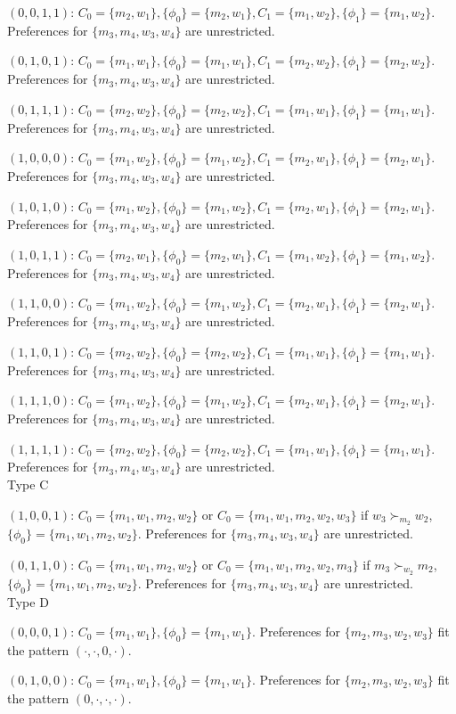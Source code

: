\documentclass[WP]{AEA}
\begin{document}
$(0,0,1,1)$: $C_0 =\{m_2,w_1\}, \{\phi_0\}=\{m_2,w_1\}, C_1 =\{m_1,w_2\}, \{\phi_1\}=\{m_1,w_2\}$.  Preferences for $\{m_3,m_4,w_3,w_4\}$ are unrestricted.


$(0,1,0,1)$: $C_0 =\{m_1,w_1\}, \{\phi_0\}=\{m_1,w_1\}, C_1 =\{m_2,w_2\}, \{\phi_1\}=\{m_2,w_2\}$.  Preferences for $\{m_3,m_4,w_3,w_4\}$ are unrestricted.


$(0,1,1,1)$: $C_0 =\{m_2,w_2\}, \{\phi_0\}=\{m_2,w_2\}, C_1 =\{m_1,w_1\}, \{\phi_1\}=\{m_1,w_1\}$.  Preferences for $\{m_3,m_4,w_3,w_4\}$ are unrestricted.


$(1,0,0,0)$: $C_0 =\{m_1,w_2\}, \{\phi_0\}=\{m_1,w_2\}, C_1 =\{m_2,w_1\}, \{\phi_1\}=\{m_2,w_1\}$.  Preferences for $\{m_3,m_4,w_3,w_4\}$ are unrestricted.


$(1,0,1,0)$: $C_0 =\{m_1,w_2\}, \{\phi_0\}=\{m_1,w_2\}, C_1 =\{m_2,w_1\}, \{\phi_1\}=\{m_2,w_1\}$.  Preferences for $\{m_3,m_4,w_3,w_4\}$ are unrestricted.


$(1,0,1,1)$: $C_0 =\{m_2,w_1\}, \{\phi_0\}=\{m_2,w_1\}, C_1 =\{m_1,w_2\}, \{\phi_1\}=\{m_1,w_2\}$.  Preferences for $\{m_3,m_4,w_3,w_4\}$ are unrestricted.



$(1,1,0,0)$:  $C_0 =\{m_1,w_2\}, \{\phi_0\}=\{m_1,w_2\}, C_1 =\{m_2,w_1\}, \{\phi_1\}=\{m_2,w_1\}$.  Preferences for $\{m_3,m_4,w_3,w_4\}$ are unrestricted.


$(1,1,0,1)$:  $C_0 =\{m_2,w_2\}, \{\phi_0\}=\{m_2,w_2\}, C_1 =\{m_1,w_1\}, \{\phi_1\}=\{m_1,w_1\}$.  Preferences for $\{m_3,m_4,w_3,w_4\}$ are unrestricted.



$(1,1,1,0)$:  $C_0 =\{m_1,w_2\}, \{\phi_0\}=\{m_1,w_2\}, C_1 =\{m_2,w_1\}, \{\phi_1\}=\{m_2,w_1\}$.  Preferences for $\{m_3,m_4,w_3,w_4\}$ are unrestricted.



$(1,1,1,1)$:  $C_0 =\{m_2,w_2\}, \{\phi_0\}=\{m_2,w_2\}, C_1 =\{m_1,w_1\}, \{\phi_1\}=\{m_1,w_1\}$.  Preferences for $\{m_3,m_4,w_3,w_4\}$ are unrestricted.
\\

Type C

$(1,0,0,1)$:  $C_0 =\{m_1,w_1,m_2,w_2\}$ or $C_0 =\{m_1,w_1,m_2,w_2, w_3\}$ if $w_3\succ_{m_2} w_2$, $\{\phi_0\}=\{m_1,w_1,m_2,w_2\}$.  Preferences for $\{m_3,m_4,w_3,w_4\}$ are unrestricted. 

$(0,1,1,0)$:  $C_0 =\{m_1,w_1,m_2,w_2\}$ or $C_0 =\{m_1,w_1,m_2,w_2, m_3\}$ if $m_3\succ_{w_2} m_2$, $\{\phi_0\}=\{m_1,w_1,m_2,w_2\}$.  Preferences for $\{m_3,m_4,w_3,w_4\}$ are unrestricted. 
\\


Type D

$(0,0,0,1)$:  $C_0 =\{m_1,w_1\}, \{\phi_0\}=\{m_1,w_1\}$.  Preferences for $\{m_2,m_3,w_2,w_3\}$ fit the pattern $(\cdot,\cdot,0,\cdot)$.


$(0,1,0,0)$:  $C_0 =\{m_1,w_1\}, \{\phi_0\}=\{m_1,w_1\}$.  Preferences for $\{m_2,m_3,w_2,w_3\}$ fit the pattern $(0,\cdot,\cdot,\cdot)$.
\end{document}
